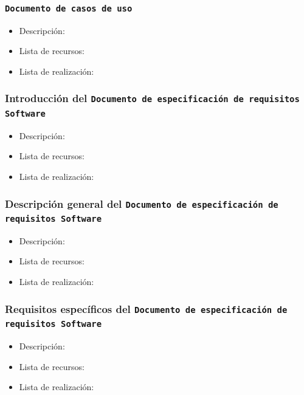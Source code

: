 \documentclass[spanish,a4paper,11pt, twoside]{report}	%
\begin{document}

			\subsubsection{\texttt{Documento de casos de uso}}
			\begin{itemize}	
				\item{Descripción:}
				\item{Lista de recursos:}
				\item{Lista de realización:}
			\end{itemize}	
	
			\subsubsection{Introducción del \texttt{Documento de especificación de requisitos Software}}
			\begin{itemize}	
				\item{Descripción:}
				\item{Lista de recursos:}
				\item{Lista de realización:}
			\end{itemize}		

			\subsubsection{Descripción general del \texttt{Documento de especificación de requisitos Software}}
			\begin{itemize}	
				\item{Descripción:}
				\item{Lista de recursos:}
				\item{Lista de realización:}
			\end{itemize}		

			\subsubsection{Requisitos específicos del \texttt{Documento de especificación de requisitos Software}}
			\begin{itemize}	
				\item{Descripción:}
				\item{Lista de recursos:}
				\item{Lista de realización:}
			\end{itemize}		
\end{document}
